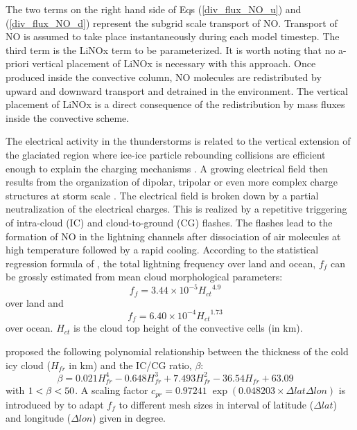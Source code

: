 %
The two terms on the right hand side of 
Eqs (\ref{div_flux_NO_u}) and (\ref{div_flux_NO_d})
represent the subgrid scale
transport of NO.
Transport of NO 
is assumed to take place instantaneously during each model timestep. 
The third term is the LiNOx term to be parameterized.
It is worth noting that 
no a-priori vertical placement of LiNOx is necessary with this approach.
Once produced inside the convective column, NO molecules are redistributed 
by upward and downward transport and detrained in the environment. The 
vertical placement of LiNOx is a direct consequence of the redistribution by 
mass fluxes inside the convective scheme. 

The electrical activity in the thunderstorms is related to the vertical 
extension of the glaciated region where ice-ice particle rebounding collisions 
are efficient enough to explain the charging mechanisms 
\citep{Reynolds1957,Takahashi1978,Saunders1992}. 
A growing electrical 
field then results from the organization of dipolar, tripolar or even 
more complex charge 
structures at storm scale \citep{Rust2002,Rust1996,Stolzenburg2002,Barthe2005}. 
The electrical field is broken down by a partial 
neutralization of the electrical charges. This is realized by a repetitive 
triggering of intra-cloud (IC) and cloud-to-ground (CG) flashes. The flashes 
lead to the formation of NO in the lightning channels after dissociation
of air molecules at high temperature followed by a rapid cooling. 
According to 
the statistical regression formula of \citet{Price1992}, 
the total lightning
frequency over land and ocean, $f_f$ can be grossly estimated from 
mean cloud morphological parameters: 
%
\begin{equation} \label{eqn : fréquence}
f_f=3.44 \times 10^{-5}{H_{ct}}^{4.9} \quad
\end{equation}
over land and 
\begin{equation} \label{eqn : fréquence2}
f_f=6.40 \times 10^{-4}{H_{ct}}^{1.73} \quad
\end{equation}
over ocean.
$H_{ct}$ is the cloud top height of the convective cells (in km).

\citet{Price1993} proposed the following polynomial relationship
between the thickness of the cold icy cloud ($H_{fr}$ in km) and the 
IC/CG ratio, $\beta$:
\begin{equation} \label{eqn : rapport}
\beta =0.021H_{fr}^4-0.648H_{fr}^3+7.493H_{fr}^2-36.54H_{fr}+63.09 \quad
\end{equation}
with $\rm 1<\beta<50$.
%
A scaling factor 
$c_{pr}=0.97241 \; \exp(0.048203\times \Delta lat \Delta lon)$ is introduced 
by \citet{Price1994} to adapt $f_f$ to different mesh sizes in 
interval of latitude ($\Delta lat$) and longitude ($\Delta lon$) given in 
degree. 

